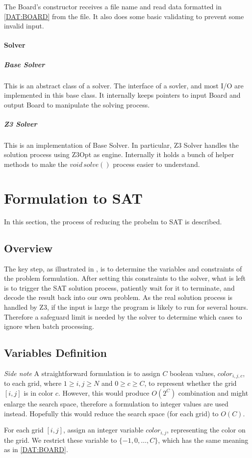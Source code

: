 \documentclass{article}
\begin{document}
\begin{spacing}{1.1}
    The Board's constructor receives a file name and read data formatted in \ref{DAT:BOARD} from the file. It also does some basic validating to prevent some invalid input.
    \paragraph{Solver}
    \subparagraph{Base Solver}
    This is an abstract class of a solver. The interface of a sovler, and most I/O are implemented in this base class. It internally keeps pointers to input Board and output Board to manipulate the solving process.
    \subparagraph{Z3 Solver}
    This is an implementation of Base Solver. In particular, Z3 Solver handles the solution process using Z3Opt as engine. Internally it holds a bunch of helper methods to make the $void\, solve()$ process easier to understand.
    \section{Formulation to SAT}
    In this section, the process of reducing the probelm to SAT is described.
    \subsection{Overview}
    The key step, as illustrated in \cite{Keszocze:2015:GER:2840819.2840941}, is to determine the variables and constraints of the problem formulation. After setting this constraints to the solver, what is left is to trigger the
    SAT solution process, patiently wait for it to terminate, and decode the result back into our own problem. As the real solution process is handled by Z3, if the input is large the program is likely to run for several hours. Therefore
    a safeguard limit is needed by the solver to determine which cases to ignore when batch processing.
    \subsection{Variables Definition}
    \emph{Side note} A straightforward formulation is to assign $C$ boolean values, $color_{i,j,c}$, to each grid, where $1 \ge i, j \ge N$ and $0 \ge c \ge C$, to represent whether the grid $[i, j]$ is in color $c$. However, this would produce $O(2^C)$ combination and might
    enlarge the search space, therefore a formulation to integer values are used instead. Hopefully this would reduce the search space (for each grid) to $O(C)$.

    For each grid $[i, j]$, assign an integer variable $color_{i, j}$, representing the color on the grid. We restrict these variable to $\{ -1, 0, \ldots, C\}$, which has the same meaning as in \ref{DAT:BOARD}.


\end{spacing}
\end{document}
